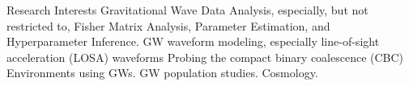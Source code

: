 
\begin{rubric}{Research Interests}
\entry*[] Gravitational Wave Data Analysis, especially, but not restricted to, Fisher Matrix Analysis, Parameter Estimation, and Hyperparameter Inference.
\entry*[] GW waveform modeling, especially line-of-sight acceleration (LOSA) waveforms
\entry*[] Probing the compact binary coalescence (CBC) Environments using GWs. 
\entry*[] GW population studies.
\entry*[] Cosmology.
    
\end{rubric}
